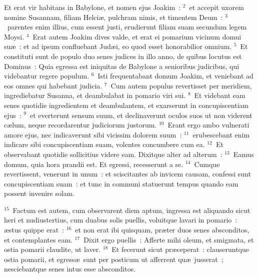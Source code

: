 \lettrine[lines=10,image=true,loversize=0.05,lraise=-0.03]{E}{}t erat vir habitans in Babylone, et nomen ejus Joakim~:
${}^{2}$~et accepit uxorem nomine Susannam, filiam Helci\ae , pulchram nimis, et timentem Deum~:
${}^{3}$~parentes enim illius, cum essent justi, erudierunt filiam suam secundum legem Moysi.
${}^{4}$~Erat autem Joakim dives valde, et erat ei pomarium vicinum domui su\ae~: et ad ipsum confluebant Jud\ae i, eo quod esset honorabilior omnium.
${}^{5}$~Et constituti sunt de populo duo senes judices in illo anno, de quibus locutus est Dominus~: Quia egressa est iniquitas de Babylone a senioribus judicibus, qui videbantur regere populum.
${}^{6}$~Isti frequentabant domum Joakim, et veniebant ad eos omnes qui habebant judicia.
${}^{7}$~Cum autem populus revertisset per meridiem, ingrediebatur Susanna, et deambulabat in pomario viri sui.
${}^{8}$~Et videbant eam senes quotidie ingredientem et deambulantem, et exarserunt in concupiscentiam ejus~:
${}^{9}$~et everterunt sensum suum, et declinaverunt oculos suos ut non viderent c\ae lum, neque recordarentur judiciorum justorum.
${}^{10}$~Erant ergo ambo vulnerati amore ejus, nec indicaverunt sibi vicissim dolorem suum~:
${}^{11}$~erubescebant enim indicare sibi concupiscentiam suam, volentes concumbere cum ea.
${}^{12}$~Et observabant quotidie sollicitius videre eam. Dixitque alter ad alterum~:
${}^{13}$~Eamus domum, quia hora prandii est. Et egressi, recesserunt a se.
${}^{14}$~Cumque revertissent, venerunt in unum~: et sciscitantes ab invicem causam, confessi sunt concupiscentiam suam~: et tunc in communi statuerunt tempus quando eam possent invenire solam.


${}^{15}$~Factum est autem, cum observarent diem aptum, ingressa est aliquando sicut heri et nudiustertius, cum duabus solis puellis, voluitque lavari in pomario~: \ae stus quippe erat~:
${}^{16}$~et non erat ibi quisquam, pr\ae ter duos senes absconditos, et contemplantes eam.
${}^{17}$~Dixit ergo puellis~: Afferte mihi oleum, et smigmata, et ostia pomarii claudite, ut laver.
${}^{18}$~Et fecerunt sicut pr\ae ceperat~: clauseruntque ostia pomarii, et egress\ae\ sunt per posticum ut afferrent qu\ae\ jusserat~; nesciebantque senes intus esse absconditos.


